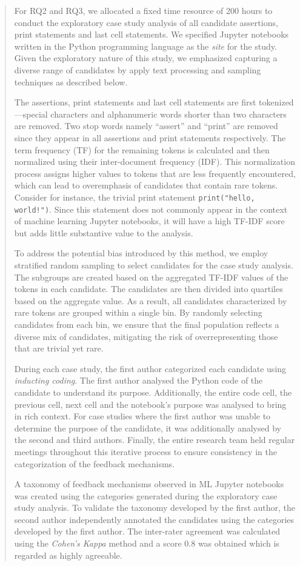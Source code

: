 \documentclass[11pt,fleqn]{article}
\begin{document}
\begin{quote}
  For RQ2 and RQ3, we allocated a fixed time resource of 200 hours to conduct the exploratory case study analysis of all candidate assertions, print statements and last cell statements. We specified Jupyter notebooks written in the Python programming language as the \emph{site} for the study. Given the exploratory nature of this study, we emphasized capturing a diverse range of candidates by apply text processing and sampling techniques as described below.

  The assertions, print statements and last cell statements are first tokenized---special characters and alphanumeric words shorter than two characters are removed. Two stop words namely ``assert'' and ``print'' are removed since they appear in all assertions and print statements respectively. The term frequency (TF) for the remaining tokens is calculated and then normalized using their inter-document frequency (IDF). This normalization process assigns higher values to tokens that are less frequently encountered, which can lead to overemphasis of candidates that contain rare tokens. Consider for instance, the trivial print statement \texttt{print("hello, world!")}. Since this statement does not commonly appear in the context of machine learning Jupyter notebooks, it will have a high TF-IDF score but adds little substantive value to the analysis.

To address the potential bias introduced by this method, we employ stratified random sampling to select candidates for the case study analysis. The subgroups are created based on the aggregated TF-IDF values of the tokens in each candidate. The candidates are then divided into quartiles based on the aggregate value. As a result, all candidates characterized by rare tokens are grouped within a single bin. By randomly selecting candidates from each bin, we ensure that the final population reflects a diverse mix of candidates, mitigating the risk of overrepresenting those that are trivial yet rare.

During each case study, the first author categorized each candidate using \emph{inducting coding}. The first author analysed the Python code of the candidate to understand its purpose. Additionally, the entire code cell, the previous cell, next cell and the notebook's purpose was analysed to bring in rich context. For case studies where the first author was unable to determine the purpose of the candidate, it was additionally analysed by the second and third authors. Finally, the entire research team held regular meetings throughout this iterative process to ensure consistency in the categorization of the feedback mechanisms.

A taxonomy of feedback mechanisms observed in ML Jupyter notebooks was created using the categories generated during the exploratory case study analysis. To validate the taxonomy developed by the first author, the second author independently annotated the candidates using the categories developed by the first author. The inter-rater agreement was calculated using the \emph{Cohen's Kappa} method and a score 0.8 was obtained which is regarded as highly agreeable.
\end{quote}
\end{document}
